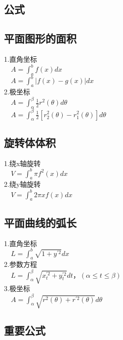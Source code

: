 \documentclass{article}
\begin{document}
\begin{flushleft}
	\LARGE
	
	\section{公式}
	
	\subsection{平面图形的面积}
	
	1.直角坐标\\
	\ \ $A=\int_{a}^{b}f(x)dx$\\
	\ \ $A=\int_{a}^{b}|f(x)-g(x)|dx$\\
	2.极坐标\\
	\ \ $A=\int_{\alpha}^{\beta}\frac{1}{2}r^2(\theta)d\theta$\\
	\ \ $A=\int_{\alpha}^{\beta}\frac{1}{2}[r_2^2(\theta)-r_1^2(\theta)]d\theta$\\
	
	\subsection{旋转体体积}
	
	1.绕x轴旋转\\
	\ \ $V=\int_{a}^{b}\pi f^2(x)dx$\\
	2.绕y轴旋转\\
	\ \ $V=\int_{a}^{b}2\pi xf(x)dx$\\
	
	\subsection{平面曲线的弧长}
	
	1.直角坐标\\
	\ \ $L=\int_{a}^{b}\sqrt{1+y^{'2}}dx$\\
	2.参数方程\\
	\ \ $L=\int_{\alpha}^{\beta}\sqrt{x_t^{'2}+y_t^{'2}}dt， (\alpha \le t \le \beta)$\\
	3.极坐标\\
	\ \ $A=\int_{\alpha}^{\beta}\sqrt{r^2(\theta)+r^{'2}(\theta)}d\theta$\\
	
	\subsection{重要公式}
	

\end{flushleft}
\end{document}
